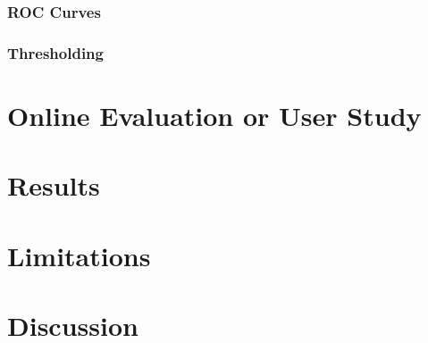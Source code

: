

\subsubsection{ROC Curves}

\subsubsection{Thresholding}

\section{Online Evaluation or User Study}

\section{Results}

\section{Limitations}

\section{Discussion}

